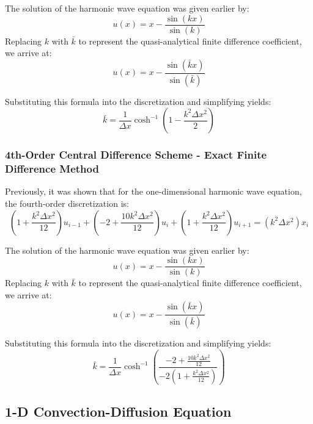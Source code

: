 \documentclass[10pt]{article}		%
\numberwithin{equation}{section}
\begin{document}
The solution of the harmonic wave equation was given earlier by:
\begin{equation}
u(x) = x - \frac{\sin(kx)}{\sin(k)}
\end{equation}
Replacing $k$ with $\bar{k}$ to represent the quasi-analytical finite difference coefficient, we arrive at:
\begin{equation}
u(x) = x - \frac{\sin(\bar{k}x)}{\sin(\bar{k})}
\end{equation}

Substituting this formula into the discretization and simplifying yields:
\begin{equation}
\bar{k} = \frac{1}{\Delta x} \cosh^{-1}\left(1-\frac{k^2\Delta x^2}{2}\right)
\end{equation}

\subsubsection{4th-Order Central Difference Scheme - Exact Finite Difference Method}

Previously, it was shown that for the one-dimensional harmonic wave equation, the fourth-order discretization is:
\begin{equation}
\left(1 + \frac{k^2\Delta x^2}{12}\right) u_{i-1} + \left(-2 + \frac{10 k^2\Delta x^2}{12}\right) u_{i} + \left(1+ \frac{k^2\Delta x^2}{12}\right) u_{i+1} = \left(k^2\Delta x^2 \right)x_i
\end{equation}

The solution of the harmonic wave equation was given earlier by:
\begin{equation}
u(x) = x - \frac{\sin(kx)}{\sin(k)}
\end{equation}
Replacing $k$ with $\bar{k}$ to represent the quasi-analytical finite difference coefficient, we arrive at:
\begin{equation}
u(x) = x - \frac{\sin(\bar{k}x)}{\sin(\bar{k})}
\end{equation}

Substituting this formula into the discretization and simplifying yields:
\begin{equation}
\bar{k} = \frac{1}{\Delta x} \cosh^{-1}\left(\frac{-2+\frac{10k^2\Delta x^2}{12}}{-2\left(1+\frac{k^2\Delta x^2}{12}\right)}\right)
\end{equation}

\newpage

\subsection{1-D Convection-Diffusion Equation}
\end{document}
